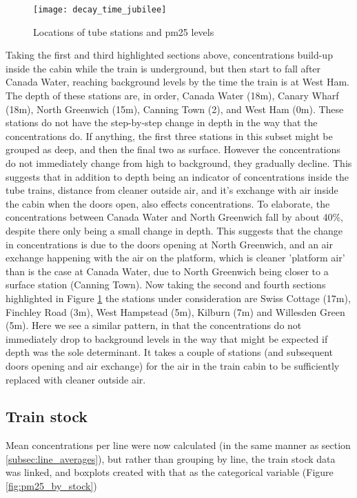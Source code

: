 \begin{figure}[H]
\centering
\texttt{[image: decay\_time\_jubilee]}
\caption{Locations of tube stations and \gls{pm25} levels}
\label{fig:decay_time_jubilee}
\end{figure}

Taking the first and third highlighted sections above, concentrations build-up inside the cabin while the train is underground, but then start to fall after Canada Water, reaching background levels by the time the train is at West Ham. The depth of these stations are, in order, Canada Water (18m), Canary Wharf (18m), North Greenwich (15m), Canning Town (2), and West Ham (0m). These stations do not have the step-by-step change in depth in the way that the concentrations do. If anything, the first three stations in this subset might be grouped as deep, and then the final two as surface. However the concentrations do not immediately change from high to background, they gradually decline. This suggests that in addition to depth being an indicator of concentrations inside the tube trains, distance from cleaner outside air, and it's exchange with air inside the cabin when the doors open, also effects concentrations. To elaborate, the concentrations between Canada Water and North Greenwich fall by about 40\%, despite there only being a small change in depth. This suggests that the change in concentrations is due to the doors opening at North Greenwich, and an air exchange happening with the air on the platform, which is cleaner 'platform air' than is the case at Canada Water, due to North Greenwich being closer to a surface station (Canning Town). 
Now taking the second and fourth sections highlighted in Figure \ref{fig:decay_time_jubilee} the stations under consideration are Swiss Cottage (17m), Finchley Road (3m), West Hampstead (5m), Kilburn (7m) and Willesden Green (5m). Here we see a similar pattern, in that the concentrations do not immediately drop to background levels in the way that might be expected if depth was the sole determinant. It takes a couple of stations (and subsequent doors opening and air exchange) for the air in the train cabin to be sufficiently replaced with cleaner outside air.

\subsection{Train stock}
\label{subsec:tube_train_stock}
Mean concentrations per line were now calculated (in the same manner as section \ref{subsec:line_averages}), but rather than grouping by line, the train stock data was linked, and boxplots created with that as the categorical variable (Figure \ref{fig:pm25_by_stock}) 

